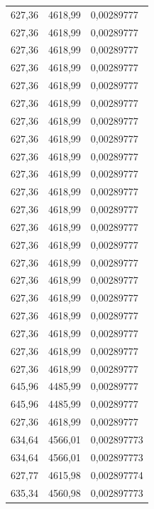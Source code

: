 \begin{center}
\begin{longtable}{|l|l|l|}
627,36            & 4618,99           & 0,00289777  \\
627,36            & 4618,99           & 0,00289777  \\
627,36            & 4618,99           & 0,00289777  \\
627,36            & 4618,99           & 0,00289777  \\
627,36            & 4618,99           & 0,00289777  \\
627,36            & 4618,99           & 0,00289777  \\
627,36            & 4618,99           & 0,00289777  \\
627,36            & 4618,99           & 0,00289777  \\
627,36            & 4618,99           & 0,00289777  \\
627,36            & 4618,99           & 0,00289777  \\
627,36            & 4618,99           & 0,00289777  \\
627,36            & 4618,99           & 0,00289777  \\
627,36            & 4618,99           & 0,00289777  \\
627,36            & 4618,99           & 0,00289777  \\
627,36            & 4618,99           & 0,00289777  \\
627,36            & 4618,99           & 0,00289777  \\
627,36            & 4618,99           & 0,00289777  \\
627,36            & 4618,99           & 0,00289777  \\
627,36            & 4618,99           & 0,00289777  \\
627,36            & 4618,99           & 0,00289777  \\
627,36            & 4618,99           & 0,00289777  \\
645,96            & 4485,99           & 0,00289777  \\
645,96            & 4485,99           & 0,00289777  \\
627,36            & 4618,99           & 0,00289777  \\
634,64            & 4566,01           & 0,002897773 \\
634,64            & 4566,01           & 0,002897773 \\
627,77            & 4615,98           & 0,002897774 \\
635,34            & 4560,98           & 0,002897773 \\

\end{longtable}
\end{center}
